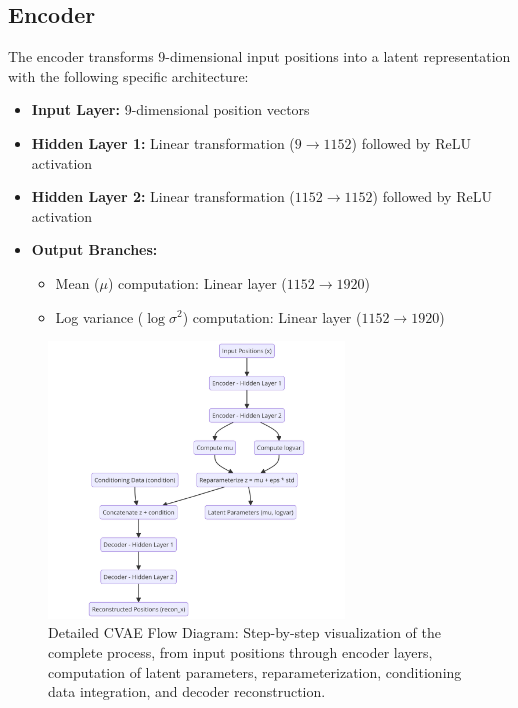 \documentclass{article}
\begin{document}
\subsection{Encoder}
The encoder transforms 9-dimensional input positions into a latent representation with the following specific architecture:
\begin{itemize}
    \item \textbf{Input Layer:} 9-dimensional position vectors
    \item \textbf{Hidden Layer 1:} Linear transformation ($9 \rightarrow 1152$) followed by ReLU activation
    \item \textbf{Hidden Layer 2:} Linear transformation ($1152 \rightarrow 1152$) followed by ReLU activation
    \item \textbf{Output Branches:}
    \begin{itemize}
        \item Mean ($\mu$) computation: Linear layer ($1152 \rightarrow 1920$)
        \item Log variance ($\log\sigma^2$) computation: Linear layer ($1152 \rightarrow 1920$)
    \end{itemize}
\end{itemize}

\begin{figure}[H]
    \centering
    \includegraphics[width=0.7\textwidth]{2.png}
    \caption{Detailed CVAE Flow Diagram: Step-by-step visualization of the complete process, from input positions through encoder layers, computation of latent parameters, reparameterization, conditioning data integration, and decoder reconstruction.}
    \label{fig:flow}
\end{figure}
\end{document}
